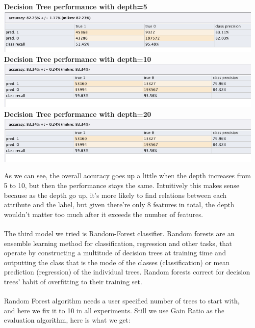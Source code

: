 \documentclass[CEJM,PDF]{cej} %
\begin{document}
\begin{center}
\textbf{Decision Tree performance with depth=5}\\
\includegraphics[scale=0.5]{rm_decition_tree_depth5.png}
\\
\textbf{Decision Tree performance with depth=10}\\
\includegraphics[scale=0.5]{rm_decision_tree_depth_50.png}
\\
\textbf{Decision Tree performance with depth=20}\\
\includegraphics[scale=0.5]{rm_decision_tree_depth_50.png}
\end{center} 
As we can see, the overall accuracy goes up a little when the depth increases from 5 to 10, but then the performance stays the same. Intuitively this makes sense because as the depth go up, it's more likely to find relations between each attribute and the label, but given there're only 8 features in total, the depth wouldn't matter too much after it exceeds the number of features.\\
\\
The third model we tried is Random-Forest classifier. Random forests are an ensemble learning method for classification, regression and other tasks, that operate by constructing a multitude of decision trees at training time and outputting the class that is the mode of the classes (classification) or mean prediction (regression) of the individual trees. Random forests correct for decision trees' habit of overfitting to their training set.\\
\\
Random Forest algorithm needs a user specified number of trees to start with, and here we fix it to 10 in all experiments. Still we use Gain Ratio as the evaluation algorithm, here is what we get:
\end{document}
